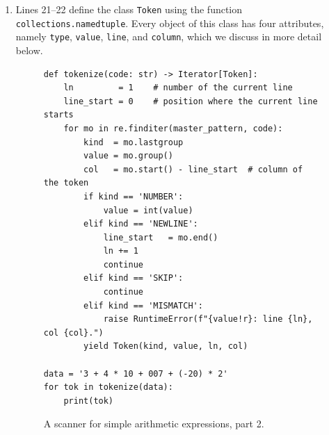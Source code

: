\begin{enumerate}
      \remarkEng
      Unlike some scanner generators, which choose the \emph{longest} matching alternative irrespective of the
      order in which the alternatives are written down, \textsl{Python}'s \texttt{re} module chooses the
      \emph{first} alternative---reading from left to right---that matches at the current position.  Therefore,
      the order of the pairs in the token specification is significant: More specific patterns have to be listed
      before more general ones.  For instance, if our language had keywords, the regular expressions for these
      keywords would have to precede the regular expression used for identifiers, since otherwise every keyword
      would incorrectly be recognized as an identifier.
      \eox
\item Lines 21--22 define the class \texttt{Token} using the function
      \texttt{collections.namedtuple}.  Every object of this class has four attributes, namely \texttt{type},
      \texttt{value}, \texttt{line}, and \texttt{column}, which we discuss in more detail below.

\begin{figure}[!ht]
  \centering
  \begin{verbatim}
def tokenize(code: str) -> Iterator[Token]:
    ln         = 1    # number of the current line
    line_start = 0    # position where the current line starts
    for mo in re.finditer(master_pattern, code):
        kind  = mo.lastgroup
        value = mo.group()
        col   = mo.start() - line_start  # column of the token
        if kind == 'NUMBER':
            value = int(value)
        elif kind == 'NEWLINE':
            line_start   = mo.end()
            ln += 1
            continue
        elif kind == 'SKIP':
            continue
        elif kind == 'MISMATCH':
            raise RuntimeError(f"{value!r}: line {ln}, col {col}.")
        yield Token(kind, value, ln, col)

data = '3 + 4 * 10 + 007 + (-20) * 2'
for tok in tokenize(data):
    print(tok)
\end{verbatim}
\vspace*{-0.3cm}
\caption{A scanner for simple arithmetic expressions, part 2.}
\label{fig:regexp-scanner.py-2}
\end{figure}


\end{enumerate}
